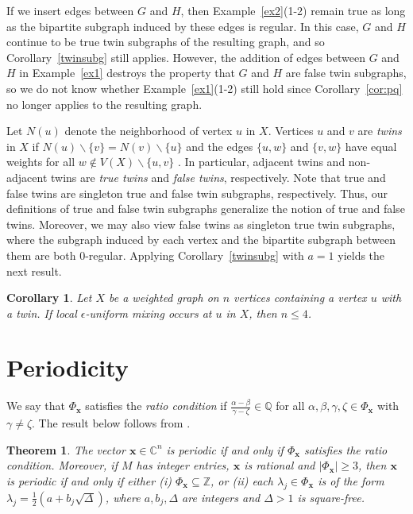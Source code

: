 \documentclass[11pt]{article}
\newtheorem{theorem}{Theorem}
\newtheorem{corollary}{Corollary}
\newcommand{\bx}{\mathbf x}
\newcommand{\supp}{{\Phi}}
\def\C{\mathbb{C}}
\def\Z{\mathbb{Z}}
\begin{document}
If we insert edges between $G$ and $H$, then Example~\ref{ex2}(1-2) remain true as long as the bipartite subgraph induced by these edges is regular. In this case, $G$ and $H$ continue to be true twin subgraphs of the resulting graph, and so Corollary~\ref{twinsubg} still applies. However, the addition of edges between $G$ and $H$ in Example~\ref{ex1} destroys the property that $G$ and $H$ are false twin subgraphs, so we do not know whether Example~\ref{ex1}(1-2) still hold since Corollary~\ref{cor:pq} no longer applies to the resulting graph.

Let $N(u)$ denote the neighborhood of vertex $u$ in $X$. Vertices $u$ and $v$ are \textit{twins} in $X$ if $N(u)\backslash\{v\}=N(v)\backslash\{u\}$ and the edges $\{u,w\}$ and $\{v,w\}$ have equal weights for all $w\notin V(X)\backslash\{u,v\}$ \cite{Kirkland2023}. In particular, adjacent twins and non-adjacent twins are \textit{true twins} and \textit{false twins}, respectively. Note that true and false twins are singleton true and false twin subgraphs, respectively. Thus, our definitions of true and false twin subgraphs generalize the notion of true and false twins. Moreover, we may also view false twins as singleton true twin subgraphs, where the subgraph induced by each vertex and the bipartite subgraph between them are both 0-regular. Applying Corollary~\ref{twinsubg} with $a=1$ yields the next result.

\begin{corollary}
\label{twin}
Let $X$ be a weighted graph on $n$ vertices containing a vertex $u$ with a twin. If local $\epsilon$-uniform mixing occurs at $u$ in $X$, then $n\leq 4$.
\end{corollary}


\section{Periodicity}\label{sec:per}
 
We say that $\supp_{\bx}$ satisfies the \textit{ratio condition} if $\frac{\alpha-\beta}{\gamma-\zeta}\in\mathbb{Q}$ for all $\alpha,\beta,\gamma,\zeta\in \supp_{\bx}$ with $\gamma\neq\zeta$. The result below follows from \cite[Theorem 3.2]{godsil2025perfect}.

\begin{theorem}
\label{thm:ratiocon}
The vector $\bx\in\C^n$ is periodic if and only if $\supp_{\bx}$ satisfies the ratio condition. Moreover, if $M$ has integer entries, $\bx$ is rational and $|\supp_{\bx}|\geq 3$, then $\bx$ is periodic if and only if either (i) $\supp_{\bx}\subseteq\Z$, or (ii) each $\lambda_j\in \supp_{\bx}$ is of the form $\lambda_j=\frac{1}{2}(a+b_j\sqrt{\Delta})$, where $a,b_j,\Delta$ are integers and $\Delta>1$ is square-free.
\end{theorem}
\end{document}
